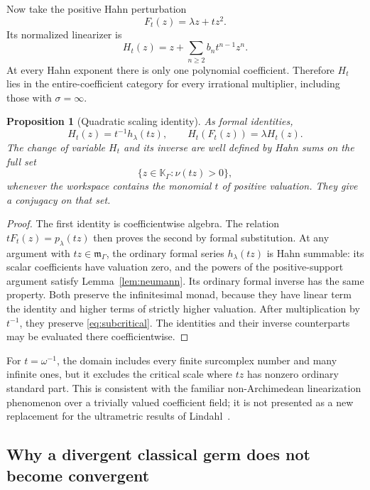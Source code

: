 \documentclass[11pt,a4paper]{article}
\numberwithin{equation}{section}
\newtheorem{proposition}[theorem]{Proposition}
\theoremstyle{definition}
\theoremstyle{remark}
\newcommand{\K}{\mathbb K}
\newcommand{\mm}{\mathfrak m}
\begin{document}
Now take the positive Hahn perturbation
\begin{equation}\label{eq:quadraticF}
 F_t(z)=\lambda z+tz^2.
\end{equation}
Its normalized linearizer is
\begin{equation}\label{eq:quadraticH}
 H_t(z)=z+\sum_{n\ge2}b_n t^{n-1}z^n.
\end{equation}
At every Hahn exponent there is only one polynomial coefficient. Therefore
$H_t$ lies in the entire-coefficient category for every irrational
multiplier, including those with $\sigma=\infty$.

\begin{proposition}[Quadratic scaling identity]\label{prop:quadraticscale}
As formal identities,
\[
 H_t(z)=t^{-1}h_\lambda(tz),\qquad
 H_t(F_t(z))=\lambda H_t(z).
\]
The change of variable $H_t$ and its inverse are well defined by Hahn sums
on the full set
\begin{equation}\label{eq:subcritical}
 \{z\in\K_\Gamma:\nu(tz)>0\},
\end{equation}
whenever the workspace contains the monomial $t$ of positive valuation.
They give a conjugacy on that set.
\end{proposition}

\begin{proof}
The first identity is coefficientwise algebra. The relation
$tF_t(z)=p_\lambda(tz)$ then proves the second by formal substitution.
At any argument with $tz\in\mm_\Gamma$, the ordinary formal series
$h_\lambda(tz)$ is Hahn summable: its scalar coefficients have valuation
zero, and the powers of the positive-support argument satisfy
Lemma~\ref{lem:neumann}. Its ordinary formal inverse has the same property.
Both preserve the infinitesimal monad, because they have linear term the
identity and higher terms of strictly higher valuation. After multiplication
by $t^{-1}$, they preserve \eqref{eq:subcritical}. The identities and their
inverse counterparts may be evaluated there coefficientwise.
\end{proof}

For $t=\omega^{-1}$, the domain includes every finite surcomplex number
and many infinite ones, but it excludes the critical scale where $tz$ has
nonzero ordinary standard part. This is consistent with the familiar
non-Archimedean linearization phenomenon over a trivially valued
coefficient field; it is not presented as a new replacement for the
ultrametric results of Lindahl~\cite{Lindahl}.

\subsection{Why a divergent classical germ does not become convergent}
\end{document}
